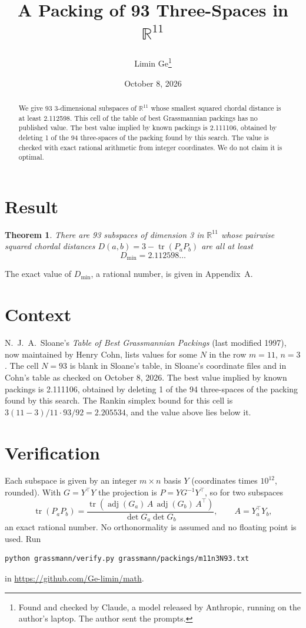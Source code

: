 \documentclass[11pt,a4paper]{article}
\title{A Packing of 93 Three-Spaces in $\mathbb{R}^{11}$}
\author{Limin Ge\thanks{Found and checked by Claude, a model released by Anthropic, running on the author's laptop. The author sent the prompts.}}
\date{October 8, 2026}
\newtheorem*{theorem}{Theorem}
\begin{document}
\maketitle
\begin{abstract}
We give 93 3-dimensional subspaces of $\mathbb{R}^{11}$ whose smallest squared chordal distance is at least 2.112598. This cell of the table of best Grassmannian packings has no published value. The best value implied by known packings is 2.111106, obtained by deleting 1 of the 94 three-spaces of the packing found by this search. The value is checked with exact rational arithmetic from integer coordinates. We do not claim it is optimal.
\end{abstract}

\section{Result}
\begin{theorem}
There are 93 subspaces of dimension 3 in $\mathbb{R}^{11}$ whose pairwise squared chordal distances $D(a,b) = 3 - \operatorname{tr}(P_aP_b)$ are all at least
\[ D_{\min} = 2.112598\ldots \]
\end{theorem}
The exact value of $D_{\min}$, a rational number, is given in Appendix~A.


\section{Context}
N.~J.~A.~Sloane's \emph{Table of Best Grassmannian Packings} (last modified 1997), now maintained by Henry Cohn, lists values for some $N$ in the row $m=11$, $n=3$. The cell $N=93$ is blank in Sloane's table, in Sloane's coordinate files and in Cohn's table as checked on October 8, 2026. The best value implied by known packings is 2.111106, obtained by deleting 1 of the 94 three-spaces of the packing found by this search. The Rankin simplex bound for this cell is $3(11-3)/11\cdot 93/92 = 2.205534$, and the value above lies below it.


\section{Verification}
Each subspace is given by an integer $m\times n$ basis $Y$ (coordinates times $10^{12}$, rounded). With $G=Y^\top Y$ the projection is $P=YG^{-1}Y^\top$, so for two subspaces
\[ \operatorname{tr}(P_aP_b)=\frac{\operatorname{tr}(\operatorname{adj}(G_a)\,A\,\operatorname{adj}(G_b)\,A^\top)}{\det G_a\det G_b},\qquad A=Y_a^\top Y_b, \]
an exact rational number. No orthonormality is assumed and no floating point is used. Run
\begin{verbatim}
python grassmann/verify.py grassmann/packings/m11n3N93.txt
\end{verbatim}
in \url{https://github.com/Ge-limin/math}.
\end{document}
